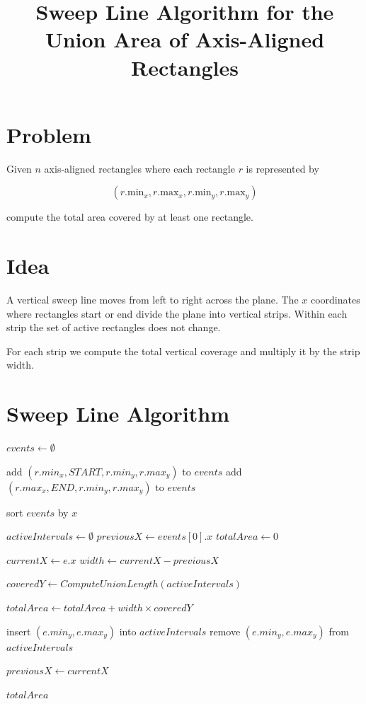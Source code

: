 \documentclass{article}
\title{Sweep Line Algorithm for the Union Area of Axis-Aligned Rectangles}
\date{}
\begin{document}
\maketitle

\section*{Problem}

Given $n$ axis-aligned rectangles where each rectangle $r$ is represented by

\[
(r.\text{min}_x, r.\text{max}_x, r.\text{min}_y, r.\text{max}_y)
\]

compute the total area covered by at least one rectangle.

\section*{Idea}

A vertical sweep line moves from left to right across the plane.  
The $x$ coordinates where rectangles start or end divide the plane into vertical strips.  
Within each strip the set of active rectangles does not change.

For each strip we compute the total vertical coverage and multiply it by the strip width.

\section*{Sweep Line Algorithm}

\begin{algorithm}
\caption{UnionArea(Rectangles)}
\begin{algorithmic}[1]

\State $events \gets \emptyset$

    \State add $(r.min_x, START, r.min_y, r.max_y)$ to $events$
    \State add $(r.max_x, END, r.min_y, r.max_y)$ to $events$
\EndFor

\State sort $events$ by $x$

\State $activeIntervals \gets \emptyset$
\State $previousX \gets events[0].x$
\State $totalArea \gets 0$


    \State $currentX \gets e.x$
    \State $width \gets currentX - previousX$

    \State $coveredY \gets ComputeUnionLength(activeIntervals)$

    \State $totalArea \gets totalArea + width \times coveredY$

        \State insert $(e.min_y, e.max_y)$ into $activeIntervals$
    \Else
        \State remove $(e.min_y, e.max_y)$ from $activeIntervals$
    \EndIf

    \State $previousX \gets currentX$

\EndFor

\State \Return $totalArea$

\end{algorithmic}
\end{algorithm}
\end{document}

